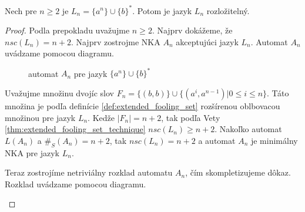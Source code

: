\begin{theorem}
\label{thm:a^nub^*}
Nech pre $ n \geq 2 $ je $ L_n = \lbrace a^{n} \rbrace \cup \lbrace b \rbrace^{*} $. Potom je jazyk $ L_n $ rozložitelný.
\end{theorem}

\begin{proof}
Podla prepokladu uvažujme $ n \geq 2 $. Najprv dokážeme, že $ nsc(L_n) = n+2$. Najprv zostrojme NKA $ A_n $ akceptujúci jazyk $ L_n $. Automat $ A_n $ uvádzame pomocou diagramu.

\begin{figure}[H]
\centering
{}
\caption{automat $ A_n $ pre jazyk $ \lbrace a^{n} \rbrace \cup \lbrace b \rbrace^{*} $}
\label{fig:a^nub^*}
\end{figure}

Uvažujme množinu dvojíc slov $ F_n = \lbrace (b,b) \rbrace \cup \lbrace (a^i, a^{n-1}) | 0 \leq i \leq n \rbrace $. Táto množina je podľa definície \ref{def:extended_fooling_set} rozšírenou oblbovacou množinou pre jazyk $ L_n $. Kedže $ |F_n| = n+2 $, tak podľa Vety \ref{thm:extended_fooling_set_technique} $ nsc(L_n) \geq n+2$. Nakoľko automat $ L(A_n) $ a $ \#_{S}(A_n) = n+2 $, tak $ nsc(L_n) = n+2$ a automat $ A_n $ je minimálny NKA pre jazyk $ L_n $.
\par
Teraz zostrojíme netriviálny rozklad automatu $ A_n $, čím skompletizujeme dôkaz. Rozklad uvádzame pomocou diagramu.

\begin{figure}[H]
\centering
{}
\end{figure}
\end{proof}
